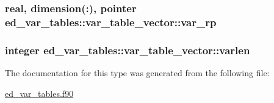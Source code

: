 \subsubsection[{var\+\_\+rp}]{\setlength{\rightskip}{0pt plus 5cm}real, dimension(\+:), pointer ed\+\_\+var\+\_\+tables\+::var\+\_\+table\+\_\+vector\+::var\+\_\+rp}\label{structed__var__tables_1_1var__table__vector_a35e8e3abcb12f944efbeb95a982e7d88}
\hypertarget{structed__var__tables_1_1var__table__vector_a53166b674050c25a50ccbe6788f8ddcb}{}
\subsubsection[{varlen}]{\setlength{\rightskip}{0pt plus 5cm}integer ed\+\_\+var\+\_\+tables\+::var\+\_\+table\+\_\+vector\+::varlen}\label{structed__var__tables_1_1var__table__vector_a53166b674050c25a50ccbe6788f8ddcb}


The documentation for this type was generated from the following file\+:\begin{DoxyCompactItemize}
\item 
\hyperlink{ed__var__tables_8f90}{ed\+\_\+var\+\_\+tables.\+f90}\end{DoxyCompactItemize}
